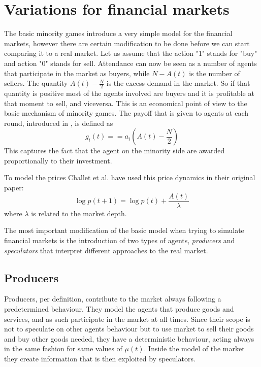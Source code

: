 \section{Variations for financial markets}
\label{minority:variations}

The basic minority games introduce a very simple model for the financial markets, however there are certain modification to be done before we can start comparing it to a real market.
Let us assume that the action "1" stands for "buy" and action "0" stands for sell.
Attendance can now be seen as a number of agents that participate in the market as buyers, while $N-A(t)$ is the number of sellers.
The quantity $A(t)-\frac{N}{2}$ is the excess demand in the market.
So if that quantity is positive most of the agents involved are buyers and it is profitable at that moment to sell, and viceversa.
This is an economical point of view to the basic mechanism of minority games.
The payoff that is given to agents at each round, introduced in \cite{challet2001stylized}, is defined as
\begin{displaymath}
g_i(t) = =a_i(A(t) - \frac{N}{2})
\end{displaymath}
This captures the fact that the agent on the minority side are awarded proportionally to their investment.

To model the prices Challet et al. have used this price dynamics in their original paper:
\begin{displaymath}
\log p(t+1) = \log p(t) + \frac{A(t)}{\lambda}
\end{displaymath}
where $\lambda$ is related to the market depth.

The most important modification of the basic model when trying to simulate financial markets is the introduction of two types of agents, \textit{producers} and \textit{speculators} that interpret different approaches to the real market.

\subsection{Producers}

Producers, per definition, contribute to the market always following a predetermined behaviour.
They model the agents that produce goods and services, and as such participate in the market at all times.
Since their scope is not to speculate on other agents behaviour but to use market to sell their goods and buy other goods needed, they have a deterministic behaviour, acting always in the same fashion for same values of $\mu(t)$.
Inside the model of the market they create information that is then exploited by speculators.

